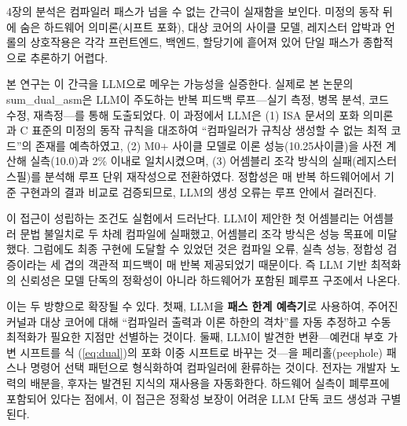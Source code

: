 4장의 분석은 컴파일러 패스가 넘을 수 없는 간극이 실재함을 보인다. 미정의 동작 뒤에 숨은
하드웨어 의미론(시프트 포화), 대상 코어의 사이클 모델, 레지스터 압박과 언롤의 상호작용은
각각 프런트엔드, 백엔드, 할당기에 흩어져 있어 단일 패스가 종합적으로 추론하기 어렵다.

본 연구는 이 간극을 LLM으로 메우는 가능성을 실증한다. 실제로 본 논문의 sum\_dual\_asm은
LLM이 주도하는 반복 피드백 루프---실기 측정, 병목 분석, 코드 수정, 재측정---를 통해
도출되었다. 이 과정에서 LLM은 (1) ISA 문서의 포화 의미론과 C 표준의 미정의 동작 규칙을
대조하여 ``컴파일러가 규칙상 생성할 수 없는 최적 코드''의 존재를 예측하였고, (2) M0+
사이클 모델로 이론 성능(10.25사이클)을 사전 계산해 실측(10.0)과 2\% 이내로 일치시켰으며,
(3) 어셈블리 조각 방식의 실패(레지스터 스필)를 분석해 루프 단위 재작성으로 전환하였다.
정합성은 매 반복 하드웨어에서 기준 구현과의 결과 비교로 검증되므로, LLM의 생성 오류는
루프 안에서 걸러진다.

이 접근이 성립하는 조건도 실험에서 드러난다. LLM이 제안한 첫 어셈블리는 어셈블러 문법
불일치로 두 차례 컴파일에 실패했고, 어셈블리 조각 방식은 성능 목표에 미달했다. 그럼에도
최종 구현에 도달할 수 있었던 것은 컴파일 오류, 실측 성능, 정합성 검증이라는 세 겹의
객관적 피드백이 매 반복 제공되었기 때문이다. 즉 LLM 기반 최적화의 신뢰성은 모델 단독의
정확성이 아니라 하드웨어가 포함된 폐루프 구조에서 나온다.

이는 두 방향으로 확장될 수 있다. 첫째, LLM을 \textbf{패스 한계 예측기}로 사용하여, 주어진
커널과 대상 코어에 대해 ``컴파일러 출력과 이론 하한의 격차''를 자동 추정하고 수동 최적화가
필요한 지점만 선별하는 것이다. 둘째, LLM이 발견한 변환---예컨대 부호 가변 시프트를 식
(\ref{eq:dual})의 포화 이중 시프트로 바꾸는 것---을 페리홀(peephole) 패스나 명령어 선택
패턴으로 형식화하여 컴파일러에 환류하는 것이다. 전자는 개발자 노력의 배분을, 후자는 발견된
지식의 재사용을 자동화한다. 하드웨어 실측이 폐루프에 포함되어 있다는 점에서, 이 접근은
정확성 보장이 어려운 LLM 단독 코드 생성과 구별된다.
